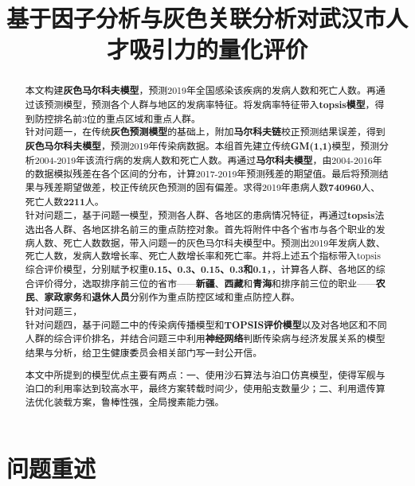 \documentclass{whutmod}
\title{基于因子分析与灰色关联分析对武汉市人才吸引力的量化评价}
\begin{document}
	
	\begin{abstract}

本文构建\textbf{灰色马尔科夫模型}，预测2019年全国感染该疾病的发病人数和死亡人数。再通过该预测模型，预测各个人群与地区的发病率特征。将发病率特征带入\textbf{topsis模型}，得到防控排名前$3$位的重点区域和重点人群。
~\\

针对问题一，在传统\textbf{灰色预测模型}的基础上，附加\textbf{马尔科夫链}校正预测结果误差，得到\textbf{灰色马尔科夫模型}，预测2019年传染病数据。本组首先建立传统\textbf{GM(1,1)}模型，预测分析2004-2019年该流行病的发病人数和死亡人数。再通过\textbf{马尔科夫模型}，由2004-2016年的数据模拟残差在各个区间的分布，计算2017-2019年预测残差的期望值。最后将预测结果与残差期望做差，校正传统灰色预测的固有偏差。求得2019年患病人数\textbf{740960}人、死亡人数\textbf{2211}人。	
~\\

针对问题二，基于问题一模型，预测各人群、各地区的患病情况特征，再通过\textbf{topsis}法选出各人群、各地区排名前三的重点防控对象。首先将附件中各个省市与各个职业的发病人数、死亡人数数据，带入问题一的灰色马尔科夫模型中。预测出2019年发病人数、死亡人数，发病人数增长率、死亡人数增长率和死亡率。并将上述五个指标带入topsis综合评价模型，分别赋予权重\textbf{0.15、0.3、0.15、0.3和0.1}，，计算各人群、各地区的综合评价得分，选取排序前三位的省市——\textbf{新疆}、\textbf{西藏}和\textbf{青海}和排序前三位的职业——\textbf{农民}、\textbf{家政家务}和\textbf{退休人员}分别作为重点防控区域和重点防控人群。
~\\

针对问题三，
~\\

针对问题四，基于问题二中的传染病传播模型和\textbf{TOPSIS评价模型}以及对各地区和不同人群的综合评价排名，并结合问题三中利用\textbf{神经网络}判断传染病与经济发展关系的模型结果与分析，给卫生健康委员会相关部门写一封公开信。

本文中所提到的模型优点主要有两点：一、使用沙石算法与泊口仿真模型，使得军舰与泊口的利用率达到较高水平，最终方案转载时间少，使用船支数量少；二、利用遗传算法优化装载方案，鲁棒性强，全局搜素能力强。

	
  


	\end{abstract}
	\tableofcontents
	\newpage	%
	
	\section{问题重述}	
\end{document}
